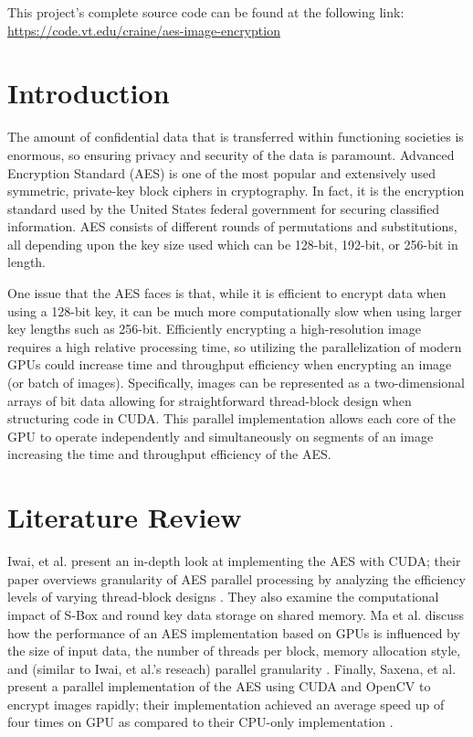 

\minitoc

\noindent This project's complete source code can be found at the following link:\\
\url{https://code.vt.edu/craine/aes-image-encryption} 
\vspace{-0.2in}

\section{Introduction}
The amount of confidential data that is transferred within functioning societies is enormous, so ensuring privacy and security of the data is paramount. Advanced Encryption Standard (AES) is one of the most popular and extensively used symmetric, private-key block ciphers in cryptography. In fact, it is the encryption standard used by the United States federal government for securing classified information. AES consists of different rounds of permutations and substitutions, all depending upon the key size used which can be 128-bit, 192-bit, or 256-bit in length.

One issue that the AES faces is that, while it is efficient to encrypt data when using a 128-bit key, it can be much more computationally slow when using larger key lengths such as 256-bit. Efficiently encrypting a high-resolution image requires a high relative processing time, so utilizing the parallelization of modern GPUs could increase time and throughput efficiency when encrypting an image (or batch of images). Specifically, images can be represented as a two-dimensional arrays of bit data allowing for straightforward thread-block design when structuring code in CUDA. This parallel implementation allows each core of the GPU to operate independently and simultaneously on segments of an image increasing the time and throughput efficiency of the AES.

\section{Literature Review}

Iwai, et al. present an in-depth look at implementing the AES with CUDA; their paper overviews granularity of AES parallel processing by analyzing the efficiency levels of varying thread-block designs \cite{Iwai2012}. They also examine the computational impact of S-Box and round key data storage on shared memory. Ma et al. discuss how the performance of an AES implementation based on GPUs is influenced by the size of input data, the number of threads per block, memory allocation style, and (similar to Iwai, et al.'s reseach) parallel granularity \cite{Ma2017}. Finally, Saxena, et al. present a parallel implementation of the AES using CUDA and OpenCV to encrypt images rapidly; their implementation achieved an average speed up of four times on GPU as compared to their CPU-only implementation \cite{Saxena2020}.

